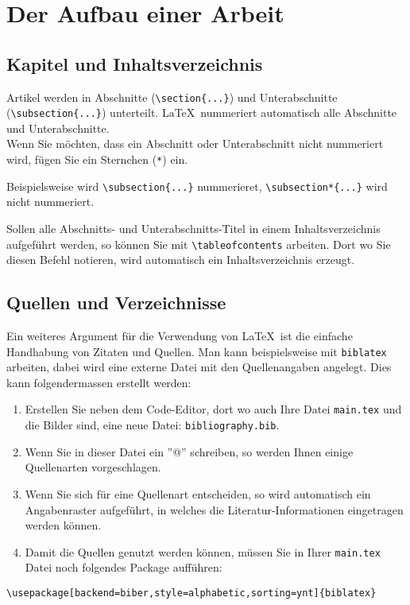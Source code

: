 \section{Der Aufbau einer Arbeit}

\subsection{Kapitel und Inhaltsverzeichnis}
Artikel werden in Abschnitte (\verb|\section{...}|) und Unterabschnitte (\verb|\subsection{...}|) unterteilt. \LaTeX\ nummeriert automatisch alle Abschnitte und Unterabschnitte.\\ Wenn Sie möchten, dass ein Abschnitt oder Unterabschnitt nicht nummeriert wird, fügen Sie ein Sternchen (\verb|*|) ein. 

\medskip
\noindent Beispielsweise wird \verb|\subsection{...}| nummerieret, \verb|\subsection*{...}| wird nicht nummeriert.

\medskip
\noindent Sollen alle Abschnitts- und Unterabschnitts-Titel in einem Inhaltsverzeichnis aufgeführt werden, so können Sie mit
\verb|\tableofcontents| arbeiten. Dort wo Sie diesen Befehl notieren, wird automatisch ein Inhaltsverzeichnis erzeugt.

\subsection{Quellen und Verzeichnisse}
Ein weiteres Argument für die Verwendung von \LaTeX\ ist die einfache Handhabung von Zitaten und Quellen. 
Man kann beispielsweise mit \texttt{biblatex} arbeiten, dabei wird eine externe Datei mit den Quellenangaben angelegt.
Dies kann folgendermassen erstellt werden:
\begin{enumerate}
	\item Erstellen Sie neben dem Code-Editor, dort wo auch Ihre Datei \texttt{main.tex} und die Bilder sind, eine neue Datei: \texttt{bibliography.bib}.
	\item Wenn Sie in dieser Datei ein ''@'' schreiben, so werden Ihnen einige Quellenarten vorgeschlagen.
	\item Wenn Sie sich für eine Quellenart entscheiden, so wird automatisch ein Angabenraster aufgeführt, in welches die Literatur-Informationen eingetragen werden können.
	\item Damit die Quellen genutzt werden können, müssen Sie in Ihrer \texttt{main.tex} Datei noch folgendes Package aufführen: 
\end{enumerate}
\qquad \qquad \verb|\usepackage[backend=biber,style=alphabetic,sorting=ynt]{biblatex} | 

